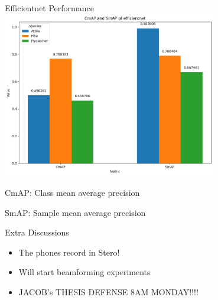 \begin{frame}{Efficientnet Performance}
    \centering
    \includegraphics[height=0.7\textheight,width=0.7\textwidth,keepaspectratio]{images/cmap_smap_3species.png}

    CmAP: Class mean average precision

    SmAP: Sample mean average precision
\end{frame}

\begin{frame}{Extra Discussions}
    \begin{itemize}
        \item The phones record in Stero!
        \item Will start beamforming experiments
        \item JACOB's THESIS DEFENSE 8AM MONDAY!!!!
    \end{itemize}
\end{frame}



